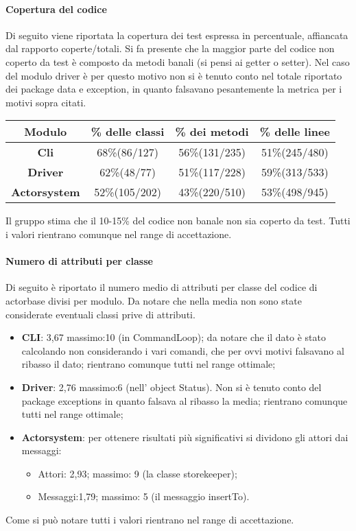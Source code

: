 \documentclass{scalatekids-article}
\begin{document}
\paragraph{Copertura del codice}
Di seguito viene riportata la copertura dei test espressa in percentuale, affiancata dal rapporto coperte/totali. Si fa presente che la maggior parte del codice non coperto da test è composto da metodi banali (si pensi ai getter o setter). Nel caso del  modulo driver è per questo motivo non si è tenuto conto nel totale riportato dei package data e exception, in quanto falsavano pesantemente la metrica per i motivi sopra citati.
\begin{center}
	\begin{tabular}{| c | c | c | c |}
		\hline
		Modulo & \% delle classi & \% dei metodi & \% delle linee \\
		\hline
		\textbf{Cli} & 68\%(86/127) & 56\%(131/235) & 51\%(245/480) \\
		\textbf{Driver} &  62\%(48/77) & 51\%(117/228) & 59\%(313/533)\\
		\textbf{Actorsystem} & 52\%(105/202) & 43\%(220/510) & 53\%(498/945)\\
		\hline
	\end{tabular}
	\end{center}
	Il gruppo stima che il 10-15\% del codice non banale non sia coperto da test. Tutti i valori rientrano comunque nel range di accettazione.
	\paragraph{Numero di attributi per classe}
	Di seguito è riportato il numero medio di attributi per classe del codice di actorbase divisi per modulo. Da notare che nella media non sono state considerate eventuali classi prive di attributi.
	\begin{itemize}
		\item \textbf{CLI}: 3,67 massimo:10 (in CommandLoop); da notare che il dato è stato calcolando non considerando i vari comandi, che per ovvi motivi falsavano al ribasso il dato; rientrano comunque tutti nel range ottimale;
		\item \textbf{Driver}: 2,76 massimo:6 (nell' object Status). Non si è tenuto conto del package exceptions in quanto falsava al ribasso la media; rientrano comunque tutti nel range ottimale;
		\item \textbf{Actorsystem}: per ottenere risultati più significativi si dividono gli attori dai messaggi:
		\begin{itemize}
			\item Attori: 2,93; massimo: 9 (la classe storekeeper);
			\item Messaggi:1,79; massimo: 5 (il messaggio insertTo).
		\end{itemize}
	\end{itemize}
	Come si può notare tutti i valori rientrano nel range di accettazione.
	
\end{document}

